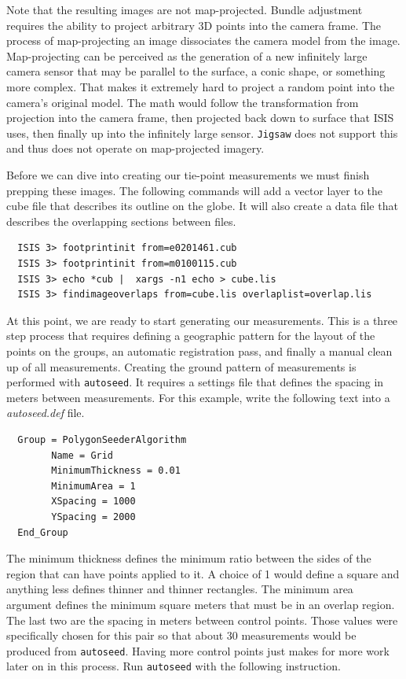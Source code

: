 Note that the resulting images are not map-projected. Bundle
adjustment requires the ability to project arbitrary 3D points into
the camera frame. The process of map-projecting an image dissociates
the camera model from the image. Map-projecting can be perceived as
the generation of a new infinitely large camera sensor that may be
parallel to the surface, a conic shape, or something more
complex. That makes it extremely hard to project a random point into
the camera's original model. The math would follow the transformation
from projection into the camera frame, then projected back down to
surface that ISIS uses, then finally up into the infinitely large
sensor. \texttt{Jigsaw} does not support this and thus does not
operate on map-projected imagery.

Before we can dive into creating our tie-point measurements we must
finish prepping these images. The following commands will add a vector
layer to the cube file that describes its outline on the globe. It
will also create a data file that describes the overlapping sections
between files.

\begin{verbatim}
  ISIS 3> footprintinit from=e0201461.cub
  ISIS 3> footprintinit from=m0100115.cub
  ISIS 3> echo *cub |  xargs -n1 echo > cube.lis
  ISIS 3> findimageoverlaps from=cube.lis overlaplist=overlap.lis
\end{verbatim}

At this point, we are ready to start generating our measurements. This
is a three step process that requires defining a geographic pattern
for the layout of the points on the groups, an automatic registration
pass, and finally a manual clean up of all measurements. Creating the
ground pattern of measurements is performed with \texttt{autoseed}. It
requires a settings file that defines the spacing in meters between
measurements. For this example, write the following text into a
\textit{autoseed.def} file.

\begin{verbatim}
  Group = PolygonSeederAlgorithm
        Name = Grid
        MinimumThickness = 0.01
        MinimumArea = 1
        XSpacing = 1000
        YSpacing = 2000
  End_Group
\end{verbatim}

The minimum thickness defines the minimum ratio between the sides of
the region that can have points applied to it. A choice of 1 would
define a square and anything less defines thinner and thinner
rectangles. The minimum area argument defines the minimum square
meters that must be in an overlap region. The last two are the spacing
in meters between control points. Those values were specifically
chosen for this pair so that about 30 measurements would be produced
from \texttt{autoseed}. Having more control points just makes for more
work later on in this process. Run \texttt{autoseed} with the
following instruction.

